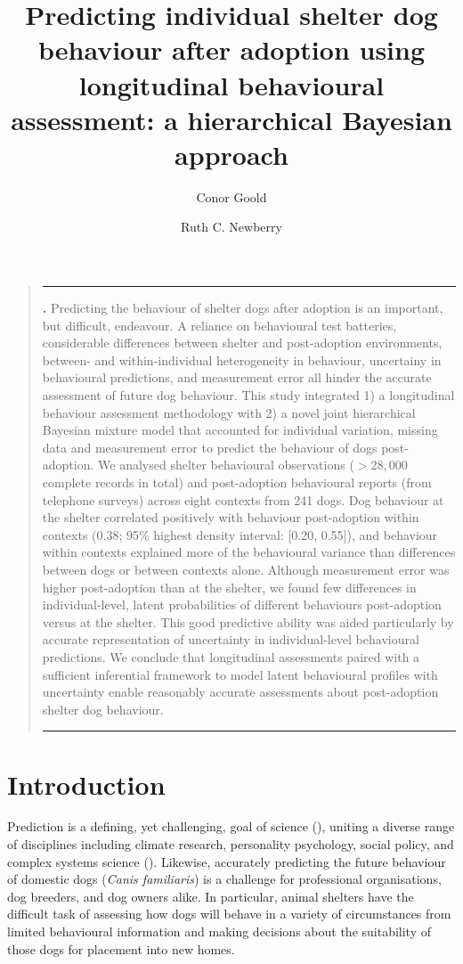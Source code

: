 \documentclass[12pt]{article}
\title{Predicting individual shelter dog behaviour after adoption using longitudinal behavioural assessment: a hierarchical Bayesian approach}
\author[1,2]{Conor Goold}
\author[2]{Ruth C. Newberry}
\affil[1]{\small{School of Biology, Faculty of Biological Sciences, University of Leeds, UK, LS2 9JT}}
\affil[2]{\small{Department of Animal and Aquacultural Sciences, Faculty of Biosciences, Norwegian University of Life Sciences, \r{A}s, Norway}}
\date{}
\renewenvironment{abstract}
{\begin{quote}
\small
\noindent \rule{\linewidth}{.5pt}\par{\bfseries \abstractname.}}
{\medskip\noindent \rule{\linewidth}{.5pt}
\end{quote}
}
\begin{document}
\linenumbers
\modulolinenumbers[5]

\maketitle

\begin{abstract}
  \small
  Predicting the behaviour of shelter dogs after adoption is an important, but difficult, endeavour. A reliance on behavioural test batteries, considerable differences between shelter and post-adoption environments, between- and within-individual heterogeneity in behaviour, uncertainy in behavioural predictions, and measurement error all hinder the accurate assessment of future dog behaviour. This study integrated 1) a longitudinal behaviour assessment methodology with 2) a novel joint hierarchical Bayesian mixture model that accounted for individual variation, missing data and measurement error to predict the behaviour of dogs post-adoption. We analysed shelter behavioural observations ($> 28,000$ complete records in total) and post-adoption behavioural reports (from telephone surveys) across eight contexts from 241 dogs. Dog behaviour at the shelter correlated positively with behaviour post-adoption within contexts (0.38; 95\% highest density interval: [0.20, 0.55]), and behaviour within contexts explained more of the behavioural variance than differences between dogs or between contexts alone. Although measurement error was higher post-adoption than at the shelter, we found few differences in individual-level, latent probabilities of different behaviours post-adoption versus at the shelter. This good predictive ability was aided particularly by accurate representation of uncertainty in individual-level behavioural predictions. We conclude that longitudinal assessments paired with a sufficient inferential framework to model latent behavioural profiles with uncertainty enable reasonably accurate assessments about post-adoption shelter dog behaviour.\\
\end{abstract}
\newpage

\section{Introduction}
Prediction is a defining, yet challenging, goal of science (\cite{hofstadter1951}), uniting a diverse range of disciplines including climate research, personality psychology, social policy, and complex systems science (\cite{sarewitz1999}). Likewise, accurately predicting the future behaviour of domestic dogs (\textit{Canis familiaris}) is a challenge for professional organisations, dog breeders, and dog owners alike. In particular, animal shelters have the difficult task of assessing how dogs will behave in a variety of circumstances from limited behavioural information and making decisions about the suitability of those dogs for placement into new homes.
\end{document}
